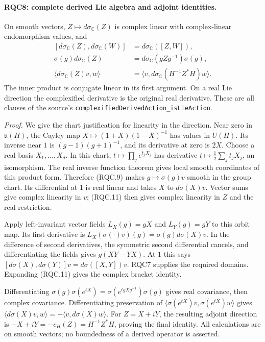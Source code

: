 \paragraph{RQC8: complete derived Lie algebra and adjoint identities.}
\label{claim:RQC8}
On smooth vectors, \(Z\mapsto d\sigma_{\mathbb C}(Z)\) is complex
linear with complex-linear endomorphism values, and
\[
\begin{split}
 [d\sigma_{\mathbb C}(Z),d\sigma_{\mathbb C}(W)]
   &=d\sigma_{\mathbb C}([Z,W]),\\
 \sigma(g)d\sigma_{\mathbb C}(Z)
   &=d\sigma_{\mathbb C}(gZg^{-1})\sigma(g),\\
 \langle d\sigma_{\mathbb C}(Z)v,w\rangle
   &=\langle v,d\sigma_{\mathbb C}(H^{-1}Z^*H)w\rangle.
\end{split}
 \tag{RQC.12}
\]
The inner product is conjugate linear in its first argument.
On a real Lie direction the complexified derivative is the original
real derivative.  These are all clauses of the source's
\texttt{complexifiedDerivedAction\_isLieAction}.

\emph{Proof.}
We give the chart justification for linearity in the direction.
Near zero in \(\mathfrak u(H)\), the Cayley map
\(X\mapsto(1+X)(1-X)^{-1}\) has values in \(U(H)\).
Its inverse near \(1\) is \((g-1)(g+1)^{-1}\), and its derivative
at zero is \(2X\).  Choose a real basis \(X_1,\ldots,X_d\).
In this chart, \(t\mapsto\prod_j e^{t_jX_j}\) has derivative
\(t\mapsto\frac12\sum_jt_jX_j\), an isomorphism.
The real inverse function theorem gives local smooth coordinates
of this product form.  Therefore (RQC.9) makes
\(g\mapsto\sigma(g)v\) smooth in the group chart.  Its differential
at \(1\) is real linear and takes \(X\) to \(d\sigma(X)v\).
Vector sums give complex linearity in \(v\); (RQC.11) then gives
complex linearity in \(Z\) and the real restriction.

Apply left-invariant vector fields \(L_X(g)=gX\) and \(L_Y(g)=gY\)
to this orbit map.  Its first derivative is
\(L_X(\sigma(\cdot)v)(g)=\sigma(g)d\sigma(X)v\).
In the difference of second derivatives, the symmetric second
differential cancels, and differentiating the fields gives
\(g(XY-YX)\).  At \(1\) this says
\([d\sigma(X),d\sigma(Y)]v=d\sigma([X,Y])v\).
RQC7 supplies the required domains.  Expanding (RQC.11) gives
the complex bracket identity.

Differentiating
\(\sigma(g)\sigma(e^{tX})=\sigma(e^{tgXg^{-1}})\sigma(g)\)
gives real covariance, then complex covariance.
Differentiating preservation of
\(\langle\sigma(e^{tX})v,\sigma(e^{tX})w\rangle\) gives
\(\langle d\sigma(X)v,w\rangle=-\langle v,d\sigma(X)w\rangle\).
For \(Z=X+iY\), the resulting adjoint direction is
\(-X+iY=-c_H(Z)=H^{-1}Z^*H\), proving the final identity.
All calculations are on smooth vectors; no boundedness of a
derived operator is asserted.

